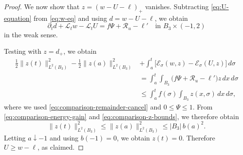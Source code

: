 \documentclass[10pt]{amsart}
\theoremstyle{plain}
\theoremstyle{definition}
\theoremstyle{remark}
\numberwithin{equation}{section}
\newcommand{\R}{\mathbb R}
\begin{document}
\begin{proof}
We now show that $z=(w-U-\ell)_+$ vanishes. Subtracting
\eqref{eq:U-equation} from \eqref{eq:w-eq} and using
$d=w-U-\ell$, we obtain
\[
\partial_t d+\mathcal L_t w-\mathcal L_t U
=f\Psi+\mathcal R_u-\ell'
\quad\text{in }B_3\times(-1,2)
\]
in the weak sense.

Testing with $z=d_+$, we obtain
\begin{align*}
\frac12\|z(t)\|_{L^2(B_3)}^2
-\frac12\|z(a)\|_{L^2(B_3)}^2
&+\int_a^t\bigl[\mathcal E_\sigma(w,z)
-\mathcal E_\sigma(U,z)\bigr]\,d\sigma\\
&=\int_a^t\int_{B_3}
\bigl(f\Psi+\mathcal R_u-\ell'\bigr)z\,dx\,d\sigma\\
&\le\int_a^t f(\sigma)\int_{B_3}z(x,\sigma)\,dx\,d\sigma,
\end{align*}
where we used \eqref{eq:comparison-remainder-cancel} and $0\le\Psi\le1$.
From \eqref{eq:comparison-energy-gain} and 
\eqref{eq:comparison-z-bounds}, we therefore obtain
\[
\|z(t)\|_{L^2(B_3)}^2
\le\|z(a)\|_{L^2(B_3)}^2
\le |B_3|\,b(a)^2.
\]
Letting $a\downarrow-1$ and using $b(-1)=0$, we obtain $z(t)=0$.
Therefore $U\ge w-\ell$, as claimed.
\end{proof}
\end{document}
